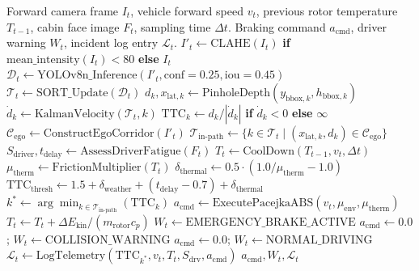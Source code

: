 \documentclass[3p,twocolumn]{elsarticle}
\begin{document}
\begin{algorithm}[!t]
\caption{End-to-End Per-Frame AEB Execution Pipeline}
\label{alg:aeb_pipeline}
\begin{algorithmic}[1]
\REQUIRE Forward camera frame $I_t$, vehicle forward speed $v_t$, previous rotor temperature $T_{t-1}$, cabin face image $F_t$, sampling time $\Delta t$.
\ENSURE Braking command $a_{\text{cmd}}$, driver warning $W_t$, incident log entry $\mathcal{L}_t$.
\STATE $I'_t \leftarrow \text{CLAHE}(I_t)$ \textbf{if} $\text{mean\_intensity}(I_t) < 80$ \textbf{else} $I_t$
\STATE $\mathcal{D}_t \leftarrow \text{YOLOv8n\_Inference}(I'_t, \text{conf}=0.25, \text{iou}=0.45)$
\STATE $\mathcal{T}_t \leftarrow \text{SORT\_Update}(\mathcal{D}_t)$
  \STATE $d_k, x_{\text{lat},k} \leftarrow \text{PinholeDepth}(y_{\text{bbox},k}, h_{\text{bbox},k})$
  \STATE $\dot{d}_k \leftarrow \text{KalmanVelocity}(\mathcal{T}_t, k)$
  \STATE $\text{TTC}_k \leftarrow d_k / |\dot{d}_k|$ \textbf{if} $\dot{d}_k < 0$ \textbf{else} $\infty$
\ENDFOR
\STATE $\mathcal{C}_{\text{ego}} \leftarrow \text{ConstructEgoCorridor}(I'_t)$
\STATE $\mathcal{T}_{\text{in-path}} \leftarrow \{k \in \mathcal{T}_t \mid (x_{\text{lat},k}, d_k) \in \mathcal{C}_{\text{ego}}\}$
\STATE $S_{\text{driver}}, t_{\text{delay}} \leftarrow \text{AssessDriverFatigue}(F_t)$
\STATE $T_t \leftarrow \text{CoolDown}(T_{t-1}, v_t, \Delta t)$
\STATE $\mu_{\text{therm}} \leftarrow \text{FrictionMultiplier}(T_t)$
\STATE $\delta_{\text{thermal}} \leftarrow 0.5 \cdot (1.0 / \mu_{\text{therm}} - 1.0)$
\STATE $\text{TTC}_{\text{thresh}} \leftarrow 1.5 + \delta_{\text{weather}} + (t_{\text{delay}} - 0.7) + \delta_{\text{thermal}}$
\STATE $k^* \leftarrow \arg\min_{k \in \mathcal{T}_{\text{in-path}}} (\text{TTC}_k)$
  \STATE $a_{\text{cmd}} \leftarrow \text{ExecutePacejkaABS}(v_t, \mu_{\text{env}}, \mu_{\text{therm}})$
  \STATE $T_t \leftarrow T_t + \Delta E_{\text{kin}} / (m_{\text{rotor}} c_p)$
  \STATE $W_t \leftarrow \text{EMERGENCY\_BRAKE\_ACTIVE}$
  \STATE $a_{\text{cmd}} \leftarrow 0.0$; $W_t \leftarrow \text{COLLISION\_WARNING}$
\ELSE
  \STATE $a_{\text{cmd}} \leftarrow 0.0$; $W_t \leftarrow \text{NORMAL\_DRIVING}$
\ENDIF
\STATE $\mathcal{L}_t \leftarrow \text{LogTelemetry}(\text{TTC}_{k^*}, v_t, T_t, S_{\text{drv}}, a_{\text{cmd}})$
\RETURN $a_{\text{cmd}}, W_t, \mathcal{L}_t$
\end{algorithmic}
\end{algorithm}
\end{document}
